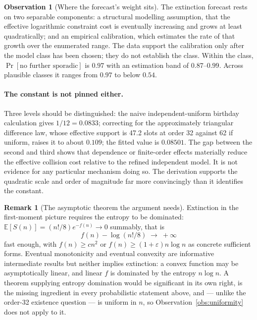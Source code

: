 \documentclass[11pt,a4paper]{article}
\theoremstyle{definition}
\newtheorem{remark}[theorem]{Remark}
\newtheorem{observation}[theorem]{Observation}
\begin{document}
\begin{observation}[Where the forecast's weight sits]
\label{obs:weight}
The extinction forecast rests on two separable components: a structural
modelling assumption, that the effective logarithmic constraint cost is
eventually increasing and grows at least quadratically; and an empirical
calibration, which estimates the rate of that growth over the enumerated range.
The data support the calibration only after the model class has been chosen; they
do not establish the class. Within the class, $\Pr[\text{no further sporadic}]$ is
$0.97$ with an estimation band of $0.87$--$0.99$. Across plausible classes it
ranges from $0.97$ to below $0.54$.
\end{observation}

\paragraph{The constant is not pinned either.} Three levels should be
distinguished: the naive independent-uniform birthday calculation gives
$1/12=0.0833$; correcting for the approximately triangular difference law, whose
effective support is 47.2 slots at order 32 against 62 if uniform, raises it to
about $0.109$; the fitted value is $0.08501$. The gap between the second and third
shows that dependence or finite-order effects materially reduce the effective
collision cost relative to the refined independent model. It is not evidence for
any particular mechanism doing so. The derivation supports the quadratic scale and
order of magnitude far more convincingly than it identifies the constant.

\begin{remark}[The asymptotic theorem the argument needs]
\label{rem:openproblem}
Extinction in the first-moment picture requires the entropy to be dominated:
$\mathbb E[S(n)]=(n!/8)e^{-f(n)}\to0$ summably, that is
\[
f(n)-\log(n!/8)\;\longrightarrow\;+\infty
\]
fast enough, with $f(n)\ge cn^2$ or $f(n)\ge(1+\varepsilon)n\log n$ as concrete
sufficient forms. Eventual monotonicity and eventual convexity are informative
intermediate results but neither implies extinction: a convex function may be
asymptotically linear, and linear $f$ is dominated by the entropy $n\log n$. A
theorem supplying entropy domination would be significant in its own right, is
the missing ingredient in every probabilistic statement above, and --- unlike the
order-32 existence question --- is uniform in $n$, so
Observation~\ref{obs:uniformity} does not apply to it.
\end{remark}
\end{document}
